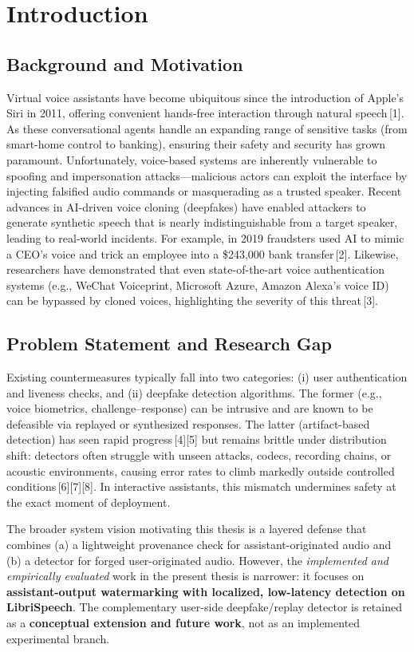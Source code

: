 
\chapter{Introduction}

\section{Background and Motivation}
Virtual voice assistants have become ubiquitous since the introduction of Apple’s Siri in 2011, offering convenient hands-free interaction through natural speech\,[1]. As these conversational agents handle an expanding range of sensitive tasks (from smart-home control to banking), ensuring their safety and security has grown paramount. Unfortunately, voice-based systems are inherently vulnerable to spoofing and impersonation attacks---malicious actors can exploit the interface by injecting falsified audio commands or masquerading as a trusted speaker. Recent advances in AI-driven voice cloning (deepfakes) have enabled attackers to generate synthetic speech that is nearly indistinguishable from a target speaker, leading to real-world incidents. For example, in 2019 fraudsters used AI to mimic a CEO’s voice and trick an employee into a \$243{,}000 bank transfer\,[2]. Likewise, researchers have demonstrated that even state-of-the-art voice authentication systems (e.g., WeChat Voiceprint, Microsoft Azure, Amazon Alexa’s voice ID) can be bypassed by cloned voices, highlighting the severity of this threat\,[3].

\section{Problem Statement and Research Gap}
Existing countermeasures typically fall into two categories: (i) user authentication and liveness checks, and (ii) deepfake detection algorithms. The former (e.g., voice biometrics, challenge--response) can be intrusive and are known to be defeasible via replayed or synthesized responses. The latter (artifact-based detection) has seen rapid progress\,[4][5] but remains brittle under distribution shift: detectors often struggle with unseen attacks, codecs, recording chains, or acoustic environments, causing error rates to climb markedly outside controlled conditions\,[6][7][8]. In interactive assistants, this mismatch undermines safety at the exact moment of deployment.

The broader system vision motivating this thesis is a layered defense that combines (a) a lightweight provenance check for assistant-originated audio and (b) a detector for forged user-originated audio. However, the \emph{implemented and empirically evaluated} work in the present thesis is narrower: it focuses on \textbf{assistant-output watermarking with localized, low-latency detection on LibriSpeech}. The complementary user-side deepfake/replay detector is retained as a \textbf{conceptual extension and future work}, not as an implemented experimental branch.

